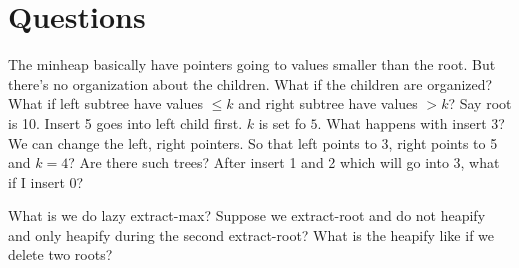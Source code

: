 \section{Questions}

The minheap basically have pointers going to values smaller
than the root.
But there's no organization about the children.
What if the children are organized?
What if left subtree have values $\leq k$ and 
right subtree have values $> k$?
Say root is 10.
Insert 5 goes into left child first. $k$ is set fo $5$.
What happens with insert 3?
We can change the left, right pointers.
So that left points to 3, right points to 5 
and $k = 4$?
Are there such trees?
After insert 1 and 2 which will go into 3,
what if I insert 0?

What is we do lazy extract-max?
Suppose we extract-root and do not heapify and only heapify during the 
second extract-root?
What is the heapify like if we delete two roots?


